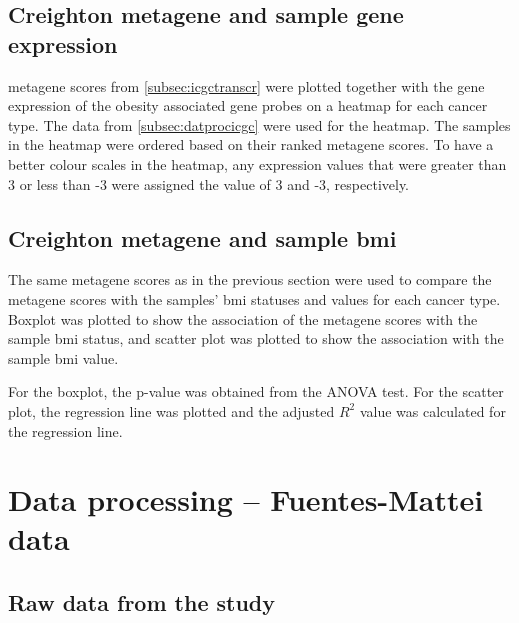 \subsection{Creighton metagene and sample gene expression}
\label{subsec:crmetaicgcge}

\Gls{metagene} scores from \cref{subsec:icgctranscr} were plotted together with the gene expression of the obesity associated gene probes on a heatmap for each cancer type.
The data from \cref{subsec:datprocicgc} were used for the heatmap.
The samples in the heatmap were ordered based on their ranked \gls{metagene} scores.
To have a better colour scales in the heatmap, any expression values that were greater than 3 or less than -3 were assigned the value of 3 and -3, respectively.

\subsection{Creighton metagene and sample \gls{bmi}}
\label{subsec:crmetaicgcge}

The same \gls{metagene} scores as in the previous section were used to compare the \gls{metagene} scores with the samples' \gls{bmi} statuses and values for each cancer type.
Boxplot was plotted to show the association of the \gls{metagene} scores with the sample \gls{bmi} status, and scatter plot was plotted to show the association with the sample \gls{bmi} value.

For the boxplot, the p-value was obtained from the ANOVA test.
For the scatter plot, the regression line was plotted and the adjusted $R^2$ value was calculated for the regression line.


\section{Data processing -- Fuentes-Mattei data}
\label{sec:dataprocessingfm}

\subsection{Raw data from the \citet{Fuentes-Mattei2014} study}
\label{subsec:rawdatafm}




